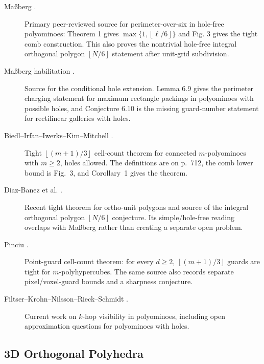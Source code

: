\documentclass[11pt]{article}
\newcommand{\floor}[1]{\left\lfloor #1 \right\rfloor}
\begin{document}
\begin{description}
  \item[Ma{\ss}berg \cite{Massberg2014}.]
  Primary peer-reviewed source for perimeter-over-six in hole-free
  polyominoes: Theorem 1 gives $\max\{1,\floor{\ell/6}\}$ and Fig. 3 gives the
  tight comb construction.  This also proves the nontrivial hole-free integral
  orthogonal polygon $\floor{N/6}$ statement after unit-grid subdivision.

  \item[Ma{\ss}berg habilitation \cite{MassbergHabilitation}.]
  Source for the conditional hole extension.  Lemma 6.9 gives the perimeter
  charging statement for maximum rectangle packings in polyominoes with
  possible holes, and Conjecture 6.10 is the missing guard-number statement
  for rectilinear galleries with holes.

  \item[Biedl--Irfan--Iwerks--Kim--Mitchell \cite{BiedlEtAl2012}.]
  Tight $\floor{(m+1)/3}$ cell-count theorem for connected $m$-polyominoes
  with $m\geq 2$, holes allowed.  The definitions are on p.~712, the comb
  lower bound is Fig.~3, and Corollary~1 gives the theorem.

  \item[Diaz-Banez et al. \cite{DiazBanezEtAl2025}.]
  Recent tight theorem for ortho-unit polygons and source of the integral
  orthogonal polygon $\floor{N/6}$ conjecture.  Its simple/hole-free reading
  overlaps with Ma{\ss}berg rather than creating a separate open problem.

  \item[Pinciu \cite{Pinciu2015}.]
  Point-guard cell-count theorem: for every $d\geq 2$,
  $\floor{(m+1)/3}$ guards are tight for $m$-poly\-hypercubes.  The same
  source also records separate pixel/voxel-guard bounds
  and a sharpness conjecture.

  \item[Filtser--Krohn--Nilsson--Rieck--Schmidt \cite{FiltserEtAl2025}.]
  Current work on $k$-hop visibility in polyominoes, including open
  approximation questions for polyominoes with holes.
\end{description}

\subsection*{3D Orthogonal Polyhedra}
\end{document}
